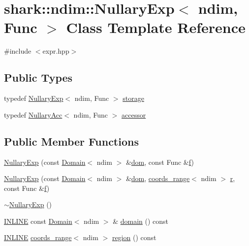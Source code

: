 \hypertarget{classshark_1_1ndim_1_1_nullary_exp}{}\section{shark\+:\+:ndim\+:\+:Nullary\+Exp$<$ ndim, Func $>$ Class Template Reference}
\label{classshark_1_1ndim_1_1_nullary_exp}


{\ttfamily \#include $<$expr.\+hpp$>$}

\subsection*{Public Types}
\begin{DoxyCompactItemize}
\item 
typedef \hyperlink{classshark_1_1ndim_1_1_nullary_exp}{Nullary\+Exp}$<$ ndim, Func $>$ \hyperlink{classshark_1_1ndim_1_1_nullary_exp_aaa0a351df054b29eef3d783eb6914ec8}{storage}
\item 
typedef \hyperlink{classshark_1_1ndim_1_1_nullary_acc}{Nullary\+Acc}$<$ ndim, Func $>$ \hyperlink{classshark_1_1ndim_1_1_nullary_exp_a3934c7a6d447182edb34537703afed68}{accessor}
\end{DoxyCompactItemize}
\subsection*{Public Member Functions}
\begin{DoxyCompactItemize}
\item 
\hyperlink{classshark_1_1ndim_1_1_nullary_exp_a8de00bdc6aab3dd30183ac0b79055bbf}{Nullary\+Exp} (const \hyperlink{classshark_1_1ndim_1_1_domain}{Domain}$<$ ndim $>$ \&\hyperlink{classshark_1_1ndim_1_1_nullary_exp_a4af666c034e0035ca4a9c4f8cf2f2ea2}{dom}, const Func \&\hyperlink{classshark_1_1ndim_1_1_nullary_exp_a30f367c05cd7978aedec0a99ca82ed0e}{f})
\item 
\hyperlink{classshark_1_1ndim_1_1_nullary_exp_afb64b1b8dff8c3904b25b6d95125fc71}{Nullary\+Exp} (const \hyperlink{classshark_1_1ndim_1_1_domain}{Domain}$<$ ndim $>$ \&\hyperlink{classshark_1_1ndim_1_1_nullary_exp_a4af666c034e0035ca4a9c4f8cf2f2ea2}{dom}, \hyperlink{structshark_1_1ndim_1_1coords__range}{coords\+\_\+range}$<$ ndim $>$ \hyperlink{classshark_1_1ndim_1_1_nullary_exp_a2ab3c895de1618318f8864c90cd7b21e}{r}, const Func \&\hyperlink{classshark_1_1ndim_1_1_nullary_exp_a30f367c05cd7978aedec0a99ca82ed0e}{f})
\item 
\hyperlink{classshark_1_1ndim_1_1_nullary_exp_a8ec438084517a13c115bd6979023abf1}{$\sim$\+Nullary\+Exp} ()
\item 
\hyperlink{common_8hpp_a2eb6f9e0395b47b8d5e3eeae4fe0c116}{I\+N\+L\+I\+NE} const \hyperlink{classshark_1_1ndim_1_1_domain}{Domain}$<$ ndim $>$ \& \hyperlink{classshark_1_1ndim_1_1_nullary_exp_ae6e867ba02940b7f1204e2910c781a9f}{domain} () const
\item 
\hyperlink{common_8hpp_a2eb6f9e0395b47b8d5e3eeae4fe0c116}{I\+N\+L\+I\+NE} \hyperlink{structshark_1_1ndim_1_1coords__range}{coords\+\_\+range}$<$ ndim $>$ \hyperlink{classshark_1_1ndim_1_1_nullary_exp_a82f2b29d4412c95428e1eda9ff454cf6}{region} () const
\end{DoxyCompactItemize}
